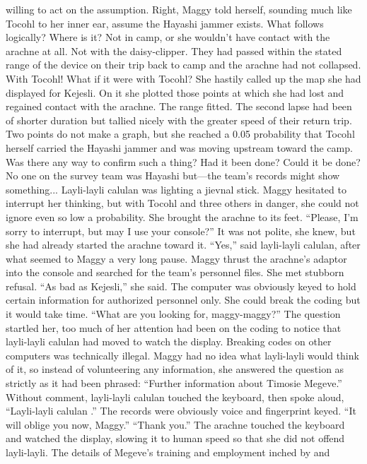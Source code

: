 \documentclass[9pt]{article}
\begin{document}
willing to act on the assumption.
Right, Maggy told herself, sounding much like Tocohl to her inner ear, assume the Hayashi jammer
exists. What follows logically?
Where is it? Not in camp, or she wouldn’t have contact with the arachne at all. Not with the
daisy-clipper. They had passed within the stated range of the device on their trip back to camp and the
arachne had not collapsed.
With Tocohl! What if it were with Tocohl?
She hastily called up the map she had displayed for Kejesli. On it she plotted those points at which
she had lost and regained contact with the arachne.
The range fitted. The second lapse had been of shorter duration but tallied nicely with the greater
speed of their return trip. Two points do not make a graph, but she reached a 0.05 probability that
Tocohl herself carried the Hayashi jammer and was moving upstream toward the camp.
Was there any way to confirm such a thing? Had it been done? Could it be done? No one on the
survey team was Hayashi but—the team’s records might show something...
Layli-layli calulan was lighting a jievnal stick. Maggy hesitated to interrupt her thinking, but with
Tocohl and three others in danger, she could not ignore even so low a probability.
She brought the arachne to its feet. “Please, I’m sorry to interrupt, but may I use your console?” It
was not polite, she knew, but she had already started the arachne toward it.
“Yes,” said layli-layli calulan, after what seemed to Maggy a very long pause.
Maggy thrust the arachne’s adaptor into the console and searched for the team’s personnel files. She
met stubborn refusal. “As bad as Kejesli,” she said. The computer was obviously keyed to hold certain
information for authorized personnel only. She could break the coding but it would take time.
“What are you looking for, maggy-maggy?”
The question startled her, too much of her attention had been on the coding to notice that layli-layli
calulan had moved to watch the display. Breaking codes on other computers was technically illegal.
Maggy had no idea what layli-layli would think of it, so instead of volunteering any information, she
answered the question as strictly as it had been phrased:
“Further information about Timosie Megeve.”
Without comment, layli-layli calulan touched the keyboard, then spoke aloud, “Layli-layli calulan
.” The records were obviously voice and fingerprint keyed. “It will oblige you now, Maggy.”
“Thank you.” The arachne touched the keyboard and watched the display, slowing it to human speed
so that she did not offend layli-layli. The details of Megeve’s training and employment inched by and
\end{document}
